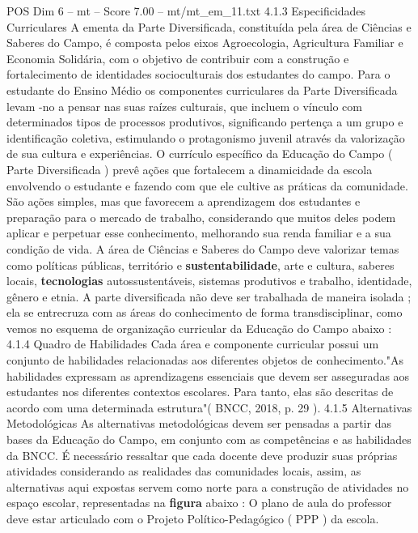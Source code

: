 \begin{textsample}{POS Dim 6 – mt – Score 7.00 – mt/mt\_em\_11.txt}  \label{ex:f6_pos_168}
4.1.3 Especificidades Curriculares A ementa da Parte Diversificada, constituída pela área de Ciências e Saberes do Campo, é composta pelos eixos Agroecologia, Agricultura Familiar e Economia Solidária, com o objetivo de contribuir com a construção e fortalecimento de identidades socioculturais dos estudantes do campo.
Para o estudante do Ensino Médio os componentes curriculares da Parte Diversificada levam -no a pensar nas suas raízes culturais, que incluem o vínculo com determinados tipos de processos produtivos, significando pertença a um grupo e identificação coletiva, estimulando o protagonismo juvenil através da valorização de sua cultura e experiências.
O currículo específico da Educação do Campo ( Parte Diversificada ) prevê ações que fortalecem a dinamicidade da escola envolvendo o estudante e fazendo com que ele cultive as práticas da comunidade.
São ações simples, mas que favorecem a aprendizagem dos estudantes e preparação para o mercado de trabalho, considerando que muitos deles podem aplicar e perpetuar esse conhecimento, melhorando sua renda familiar e a sua condição de vida.
A área de Ciências e Saberes do Campo deve valorizar temas como políticas públicas, território e \textbf{sustentabilidade}, arte e cultura, saberes locais, \textbf{tecnologias} autossustentáveis, sistemas produtivos e trabalho, identidade, gênero e etnia.
A parte diversificada não deve ser trabalhada de maneira isolada ; ela se entrecruza com as áreas do conhecimento de forma transdisciplinar, como vemos no esquema de organização curricular da Educação do Campo abaixo : 4.1.4 Quadro de Habilidades Cada área e componente curricular possui um conjunto de habilidades relacionadas aos diferentes objetos de conhecimento."As habilidades expressam as aprendizagens essenciais que devem ser asseguradas aos estudantes nos diferentes contextos escolares.
Para tanto, elas são descritas de acordo com uma determinada estrutura"( BNCC, 2018, p. 29 ). 4.1.5 Alternativas Metodológicas As alternativas metodológicas devem ser pensadas a partir das bases da Educação do Campo, em conjunto com as competências e as habilidades da BNCC.
É necessário ressaltar que cada docente deve produzir suas próprias atividades considerando as realidades das comunidades locais, assim, as alternativas aqui expostas servem como norte para a construção de atividades no espaço escolar, representadas na \textbf{figura} abaixo : O plano de aula do professor deve estar articulado com o Projeto Político-Pedagógico ( PPP ) da escola.

\end{textsample}
